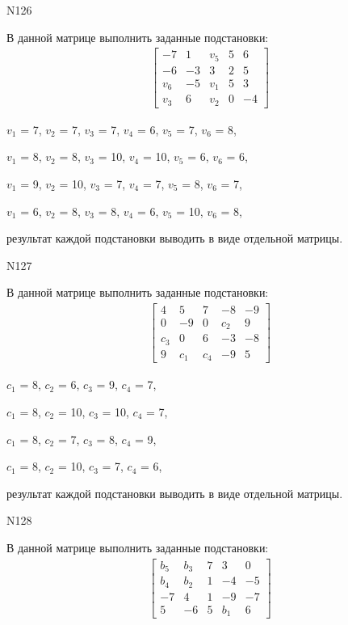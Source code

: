 \documentclass[11pt]{report}
\begin{document}
N126

В данной матрице выполнить заданные подстановки:
\begin{align*}
\left[\begin{matrix}-7 & 1 & v_{5} & 5 & 6\\-6 & -3 & 3 & 2 & 5\\v_{6} & -5 & v_{1} & 5 & 3\\v_{3} & 6 & v_{2} & 0 & -4\end{matrix}\right]
\end{align*}


$v_{1}$ = 7, $v_{2}$ = 7, $v_{3}$ = 7, $v_{4}$ = 6, $v_{5}$ = 7, $v_{6}$ = 8, 

$v_{1}$ = 8, $v_{2}$ = 8, $v_{3}$ = 10, $v_{4}$ = 10, $v_{5}$ = 6, $v_{6}$ = 6, 

$v_{1}$ = 9, $v_{2}$ = 10, $v_{3}$ = 7, $v_{4}$ = 7, $v_{5}$ = 8, $v_{6}$ = 7, 

$v_{1}$ = 6, $v_{2}$ = 8, $v_{3}$ = 8, $v_{4}$ = 6, $v_{5}$ = 10, $v_{6}$ = 8, 

результат каждой подстановки выводить в виде отдельной матрицы.

N127

В данной матрице выполнить заданные подстановки:
\begin{align*}
\left[\begin{matrix}4 & 5 & 7 & -8 & -9\\0 & -9 & 0 & c_{2} & 9\\c_{3} & 0 & 6 & -3 & -8\\9 & c_{1} & c_{4} & -9 & 5\end{matrix}\right]
\end{align*}


$c_{1}$ = 8, $c_{2}$ = 6, $c_{3}$ = 9, $c_{4}$ = 7, 

$c_{1}$ = 8, $c_{2}$ = 10, $c_{3}$ = 10, $c_{4}$ = 7, 

$c_{1}$ = 8, $c_{2}$ = 7, $c_{3}$ = 8, $c_{4}$ = 9, 

$c_{1}$ = 8, $c_{2}$ = 10, $c_{3}$ = 7, $c_{4}$ = 6, 

результат каждой подстановки выводить в виде отдельной матрицы.

N128

В данной матрице выполнить заданные подстановки:
\begin{align*}
\left[\begin{matrix}b_{5} & b_{3} & 7 & 3 & 0\\b_{4} & b_{2} & 1 & -4 & -5\\-7 & 4 & 1 & -9 & -7\\5 & -6 & 5 & b_{1} & 6\end{matrix}\right]
\end{align*}
\end{document}
